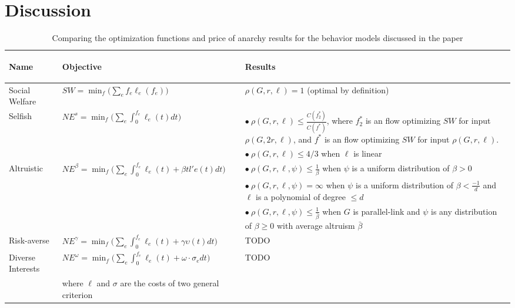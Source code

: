 \section{Discussion}\label{sec:discussion}

\begin{table}[h]
\begin{center}
    \begin{tabular}{|p{2cm}| p{7cm} | p{8cm}|} 
 \hline
        \begin{center}Name\end{center} & \begin{center}Objective\end{center} & \begin{center} Results\end{center} \\
 \hline\hline
        Social Welfare & $SW = \min_f\Big(\sum_e f_e\ell_e(f_e)\Big)$ & $\rho(G,r,\ell) = 1$ (optimal by definition) \\
 \hline
     Selfish & $NE^s = \min_f\Big(\sum_e\int_0^{f_e} \ell_e(t)dt\Big)$ & 
        $\bullet~\rho(G,r,\ell) \le \frac{C(f^*_2)}{C(f^*)}$, where $f^*_2$ is an flow optimizing $SW$ for input $\rho(G,2r,\ell)$, and $f^*$ is an flow optimizing $SW$ for input $\rho(G,r,\ell)$.\\ 
        &  & $\bullet~\rho(G,r,\ell) \le 4/3$ when $\ell$ is linear\\
 \hline
        Altruistic & $NE^\beta = \min_f\Big(\sum_e\int_0^{f_e} \ell_e(t) + \beta tl'e(t)dt\Big)$ & 
        $\bullet~\rho(G,r,\ell,\psi) \le \frac{1}{\beta}$ when $\psi$ is a uniform distribution of $\beta >0$\\
        & & $\bullet~\rho(G,r,\ell,\psi) = \infty$ when $\psi$ is a uniform distribution of $\beta < \frac{-1}{d}$ and $\ell$ is a polynomial of degree $\le d$\\
        & & $\bullet~\rho(G,r,\ell,\psi) \le \frac{1}{\bar{\beta}}$ when $G$ is parallel-link and $\psi$ is any distribution of $\beta \ge 0$ with average altruism $\bar{\beta}$\\
\hline
     Risk-averse & $NE^\gamma = \min_f\Big(\sum_e\int_0^{f_e} \ell_e(t) + \gamma\upsilon(t)dt\Big)$ & TODO\\
\hline
     Diverse Interests & $NE^\omega = \min_f\Big(\sum_e\int_0^{f_e} \ell_e(t) + \omega\cdot \sigma_e dt\Big)$ & TODO\\
     & where $\ell$ and $\sigma$ are the costs of two general criterion &\\
\hline
\end{tabular}
\end{center}
    \caption{Comparing the optimization functions and price of anarchy results for the behavior models discussed in the paper}
    \label{tab:comparison}
\end{table}

